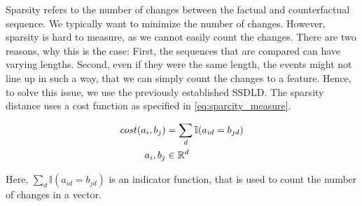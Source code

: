 \documentclass[./../../paper.tex]{subfiles}
\begin{document}
Sparsity refers to the number of changes between the factual and counterfactual sequence. We typically want to minimize the number of changes. However, sparsity is hard to measure, as we cannot easily count the changes. There are two reasons, why this is the case: First, the sequences that are compared can have varying lengths. Second, even if they were the same length, the events might not line up in such a way, that we can simply count the changes to a feature. Hence, to solve this issue, we use the previously established \gls{SSDLD}. The sparsity distance uses a cost function as specified in \autoref{eq:sparcity_measure}.

\begin{align}
    \label{eq:sparcity_measure}                          
    cost(a_i, b_j)      & = \sum_d \mathbb{I}(a_{id} = b_{jd})  \\ 
    a_i,b_j        & \in \mathbb{R}^d \nonumber 
\end{align}

\noindent Here, $\sum_d \mathbb{I}(a_{id} = b_{jd})$ is an indicator function, that is used to count the number of changes in a vector. 





        


        
        

        
\end{document}

